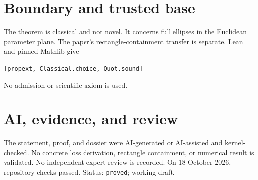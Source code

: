 \documentclass[11pt]{article}
\begin{document}
\section{Boundary and trusted base}
The theorem is classical and not novel. It concerns full ellipses in the Euclidean
parameter plane. The paper's rectangle-containment transfer is separate. Lean and pinned
Mathlib give \begin{center}\texttt{[propext, Classical.choice, Quot.sound]}\end{center}
No admission or scientific axiom is used.

\section{AI, evidence, and review}
The statement, proof, and dossier were AI-generated or AI-assisted and kernel-checked.
No concrete loss derivation, rectangle containment, or numerical result is validated. No
independent expert review is recorded. On 18 October 2026, repository checks passed.
Status: \texttt{proved}; working draft.
\end{document}
